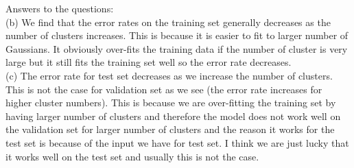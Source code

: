 \documentclass[10pt]{article}
\begin{document}
Answers to the questions: \\

(b) We find that the error rates on the training set generally decreases as the number of clusters increases. This is because it is easier to fit to larger number of Gaussians. It obviously over-fits the training data if the number of cluster is very large but it still fits the training set well so the error rate decreases. \\

(c) The error rate for test set decreases as we increase the number of clusters. This is not the case for validation set as we see (the error rate increases for higher cluster numbers). This is because we are over-fitting the training set by having larger number of clusters and therefore the model does not work well on the validation set for larger number of clusters and the reason it works for the test set is because of the input we have for test set. I think we are just lucky that it works well on the test set and usually this is not the case.
\end{document}
